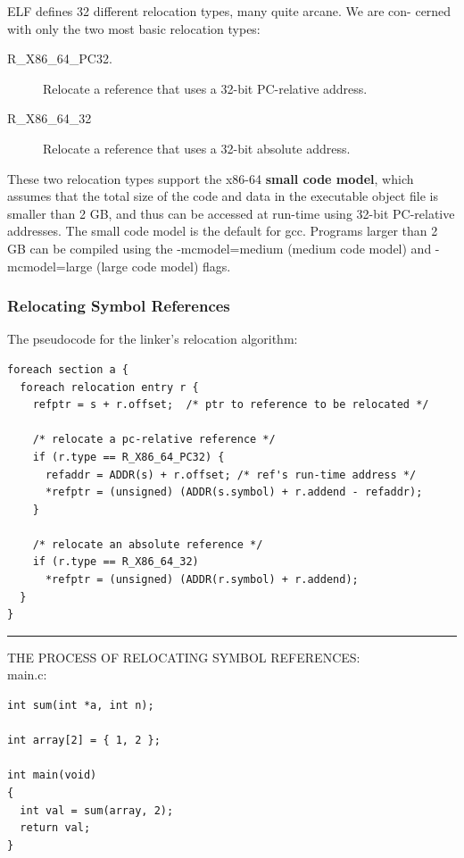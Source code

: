 \documentclass[11pt]{article}
\begin{document}
ELF defines 32 different relocation types, many quite arcane. We are con- cerned with only the two most basic relocation types:\\
\begin{description}
\item[{R\_X86\_64\_PC32.}] Relocate a reference that uses a 32-bit PC-relative address.\\
\item[{R\_X86\_64\_32}] Relocate a reference that uses a 32-bit absolute address.\\
\end{description}


These two relocation types support the x86-64 \textbf{small code model}, which assumes that the total size of the code and data in the executable object file is smaller than 2 GB, and thus can be accessed at run-time using 32-bit PC-relative addresses. The small code model is the default for gcc. Programs larger than 2 GB can be compiled using the -mcmodel=medium (medium code model) and -mcmodel=large (large code model) flags.\\


\subsubsection{Relocating Symbol References}
\label{sec:org65f4b26}
The pseudocode for the linker's relocation algorithm:\\
\begin{verbatim}
foreach section a {
  foreach relocation entry r {
    refptr = s + r.offset;	/* ptr to reference to be relocated */

    /* relocate a pc-relative reference */
    if (r.type == R_X86_64_PC32) {
      refaddr = ADDR(s) + r.offset; /* ref's run-time address */
      *refptr = (unsigned) (ADDR(s.symbol) + r.addend - refaddr);
    }

    /* relocate an absolute reference */
    if (r.type == R_X86_64_32)
      *refptr = (unsigned) (ADDR(r.symbol) + r.addend);
  }
}
\end{verbatim}

\noindent\rule{\textwidth}{0.5pt}
THE PROCESS OF RELOCATING SYMBOL REFERENCES:\\

main.c:\\
\begin{verbatim}
int sum(int *a, int n);

int array[2] = { 1, 2 };

int main(void)
{
  int val = sum(array, 2);
  return val;
}
\end{verbatim}
\end{document}
